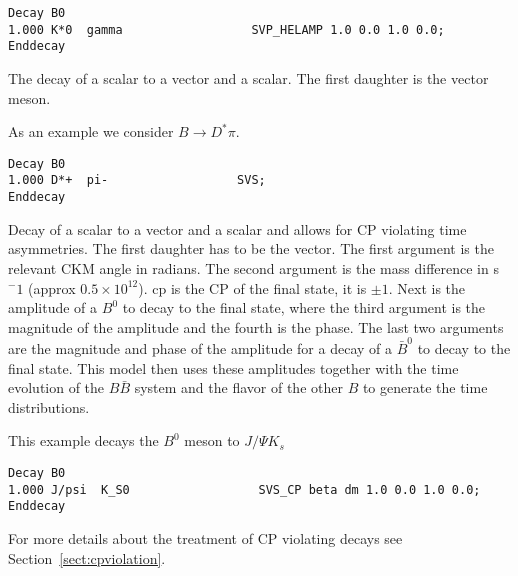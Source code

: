 \Example
\begin{verbatim}
Decay B0
1.000 K*0  gamma                  SVP_HELAMP 1.0 0.0 1.0 0.0;
Enddecay
\end{verbatim}


\label{svs}



\Expl
The decay of a scalar to a vector and a scalar. The first 
daughter is the vector meson.

\Example
As an example we consider $B\rightarrow D^*\pi$.

\begin{verbatim}
Decay B0
1.000 D*+  pi-                  SVS;
Enddecay
\end{verbatim}



\label{svscp}



\Expl
Decay of a scalar to a vector and a scalar and allows for CP violating 
time asymmetries. The first daughter has to be the vector.
The first argument is the relevant CKM
angle in radians. The second argument is the mass difference
in s$^-1$ (approx $0.5\times 10^{12}$). 
cp is the CP of the final state, it is $\pm 1$. 
Next is the amplitude 
of a $B^0$ to decay to the final state, where the third argument is the 
magnitude of the amplitude and the fourth is the phase. The
last two arguments are the magnitude and phase of the
amplitude for a decay of a $\bar B^0$ to decay to the 
final state. This model then uses these amplitudes 
together with the time evolution of the
$B\bar B$ system and the flavor of the other
$B$ to generate the time distributions.


\Example
This example decays the $B^0$ meson to $J/\Psi K_s$
\begin{verbatim}
Decay B0
1.000 J/psi  K_S0                  SVS_CP beta dm 1.0 0.0 1.0 0.0;
Enddecay
\end{verbatim}

\Notes
For more details about the treatment of CP violating decays 
see Section~\ref{sect:cpviolation}.



\label{svscpiso}



